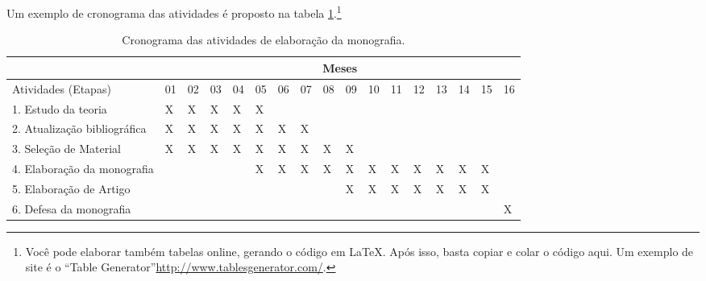 Um exemplo de cronograma das atividades é proposto na tabela \ref{tab:cronograma}.\footnote{Voc{\^e} pode elaborar também tabelas online, gerando o código em \LaTeX. Após isso, basta copiar e colar o código aqui. Um exemplo de site é o ``Table Generator''\url{http://www.tablesgenerator.com/}.}
  
\begin{table}[h]
\ABNTEXfontereduzida
\caption[Cronograma das atividades]{Cronograma das atividades de elaboração da monografia.}
\label{tab:cronograma}
\begin{minipage}{0.3\textwidth}
    \centering
\begin{tabular}{|l|l|l|l|l|l|l|l|l|l|l|l|l|l|l|l|l|}
\hline
                             & \multicolumn{16}{c|}{Meses}                                                   \\ \hline
Atividades (Etapas)          & 01 & 02 & 03 & 04 & 05 & 06 & 07 & 08 & 09 & 10 & 11 & 12 & 13 & 14 & 15 & 16 \\ \hline
1. Estudo da teoria          & X  & X  & X  & X  & X  &    &    &    &    &    &    &    &    &    &    &    \\ \hline
2. Atualização bibliográfica & X  & X  & X  & X  & X  & X  & X  &    &    &    &    &    &    &    &    &    \\ \hline
3. Seleção de Material       & X  & X  & X  & X  & X  & X  & X  & X  & X  &    &    &    &    &    &    &    \\ \hline
4. Elaboração da monografia  &    &    &    &    & X  & X  & X  & X  & X  & X  & X  & X  & X  & X  & X  &    \\ \hline
5. Elaboração de Artigo      &    &    &    &    &    &    &    &    & X  & X  & X  & X  & X  & X  & X  &    \\ \hline
6. Defesa da monografia      &    &    &    &    &    &    &    &    &    &    &    &    &    &    &    & X  \\ \hline
\end{tabular}
  \end{minipage}
\end{table}
